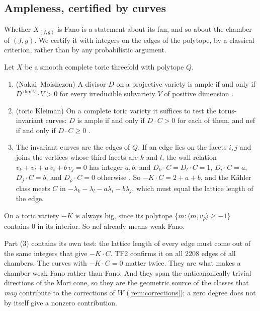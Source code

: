 \documentclass[11pt]{article}
\theoremstyle{definition}\newtheorem{definition}[theorem]{Definition}\newtheorem{remark}[theorem]{Remark}\newtheorem{example}[theorem]{Example}\newtheorem{problem}[theorem]{Open problem}\crefname{problem}{Problem}{Problems}
\begin{document}
\subsection{Ampleness, certified by curves}
Whether $X_{(f,g)}$ is Fano is a statement about its fan, and so about the chamber of $(f,g)$. We certify it with integers on the edges of the polytope, by a classical criterion, rather than by
any probabilistic argument.

\begin{proposition}\label{prop:kleiman}
Let $X$ be a smooth complete toric threefold with polytope $Q$.
\begin{enumerate}
\item[(1)] (Nakai--Moishezon) A divisor $D$ on a projective variety is ample if and only if $D^{\dim V}\cdot V>0$ for every irreducible subvariety $V$ of positive dimension \cite{Kleiman1966}.
\item[(2)] (toric Kleiman) On a complete toric variety it suffices to test the torus-invariant curves: $D$ is ample if and only if $D\cdot C>0$ for each of them, and nef if and only if $D\cdot C\ge0$
\cite[Theorem~6.3.13 and \S6.3]{CLS2011}.
\item[(3)] The invariant curves are the edges of $Q$. If an edge lies on the facets $i,j$ and joins the vertices whose third facets are $k$ and $l$, the wall relation $v_k+v_l+a\,v_i+b\,v_j=0$ has
integer $a,b$, and $D_k\cdot C=D_l\cdot C=1$, $D_i\cdot C=a$, $D_j\cdot C=b$, and $D_\rho\cdot C=0$ otherwise \cite[\S6.4]{CLS2011}. So $-K\cdot C=2+a+b$, and the K\"ahler class meets $C$ in
$-\lambda_k-\lambda_l-a\lambda_i-b\lambda_j$, which must equal the lattice length of the edge.
\end{enumerate}
On a toric variety $-K$ is always big, since its polytope $\{m:\langle m,v_\rho\rangle\ge-1\}$ contains $0$ in its interior. So nef already means weak Fano.
\end{proposition}

Part (3) contains its own test: the lattice length of every edge must come out of the same integers that give $-K\cdot C$. TF2 confirms it on all $2208$ edges of all chambers. The curves with
$-K\cdot C=0$ matter twice. They are what makes a chamber weak Fano rather than Fano. And they span the anticanonically trivial directions of the Mori cone, so they are the geometric source of the classes that \emph{may} contribute to the corrections of $W$ (\cref{rem:corrections}); a zero degree does not by itself give a nonzero contribution.
\end{document}
